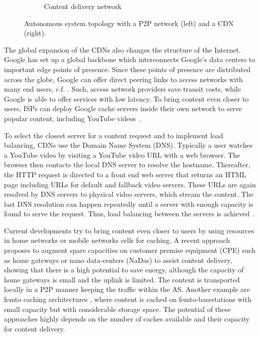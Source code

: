 \begin{figure}[bt]
\begin{subfigure}[b]{0.54\textwidth}
    \vspace{-0.5cm}
    \caption{Content delivery network}
    \label{fig:aslevel:cdn}
	\end{subfigure}
\hspace{-0.5cm}
	\caption{Autonomous system topology with a P2P network (left) and a CDN (right).}\label{fig:aslevel:p2pcdn}
\end{figure}

The global expansion of the CDNs also changes the structure of the Internet.
Google has set up a global backbone which interconnects Google's data centers to important edge points of presence.
Since these points of presence are distributed across the globe, Google can offer direct peering links to access networks with many end users, c.f. .
Such, access network providers save transit costs, while Google is able to offer services with low latency.
To bring content even closer to users, ISPs can deploy Google cache servers inside their own network to serve popular content, including YouTube videos~\cite{gcc}.

To select the closest server for a content request and to implement load balancing, CDNs use the Domain Name System (DNS).
Typically a user watches a YouTube video by visiting a YouTube video URL with a web browser.
The browser then contacts the local DNS server to resolve the hostname.
Thereafter, the HTTP request is directed to a front end web server that returns an HTML page including URLs for default and fallback video servers.
These URLs are again resolved by DNS servers to physical video servers, which stream the content.
The last DNS resolution can happen repeatedly until a server with enough capacity is found to serve the request.
Thus, load balancing between the servers is achieved~\cite{adhikari2012vivisecting}.

Current developments try to bring content even closer to users by using resources in home networks or mobile networks cells for caching.
A recent approach \cite{valancius2009greening} proposes to augment spare capacities on customer premise equipment (CPE) such as home gateways or nano data-centers (NaDas) to assist content delivery, showing that there is a high potential to save energy, although the capacity of home gateways is small and the uplink is limited.
The content is transported locally in a P2P manner keeping the traffic within the AS.
Another example are femto caching architectures \cite{golrezaei2013femtocaching}, where content is cached on femto-basestations with small capacity but with considerable storage space.
The potential of these approaches highly depends on the number of caches available and their capacity for content delivery.

